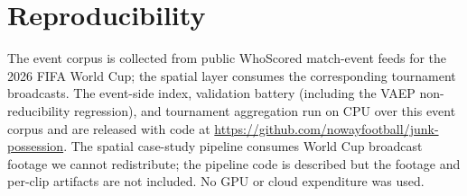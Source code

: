 \documentclass[11pt]{article}
\begin{document}
\section{Reproducibility}
\label{sec:repro}

The event corpus is collected from public WhoScored match-event feeds for the
2026 FIFA World Cup; the spatial layer consumes the corresponding tournament
broadcasts. The event-side index, validation battery (including the VAEP
non-reducibility regression), and tournament aggregation run on CPU over this
event corpus and are released with code at
\url{https://github.com/nowayfootball/junk-possession}.
The spatial case-study pipeline consumes World Cup broadcast footage we cannot
redistribute; the pipeline code is described but the footage and per-clip
artifacts are not included. No GPU or cloud expenditure was used.



\end{document}
